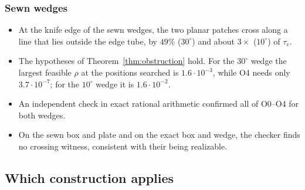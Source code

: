 \subsubsection*{Sewn wedges}
\begin{itemize}
\item At the knife edge of the sewn wedges, the two planar patches cross along a line that lies outside the edge
tube, by $49\%$ ($30^\circ$) and about $3\times$ ($10^\circ$) of $\tau_e$.
\item The hypotheses of Theorem~\ref{thm:obstruction} hold. For the $30^\circ$ wedge the largest feasible $\rho$ at
the positions searched is $1.6\cdot10^{-3}$, while O4 needs only $3.7\cdot10^{-7}$; for the $10^\circ$ wedge it is
$1.6\cdot10^{-2}$.
\item An independent check in exact rational arithmetic confirmed all of O0--O4 for both wedges.
\item On the sewn box and plate and on the exact box and wedge, the checker finds no crossing witness, consistent
with their being realizable.
\end{itemize}

\subsection{Which construction applies}

